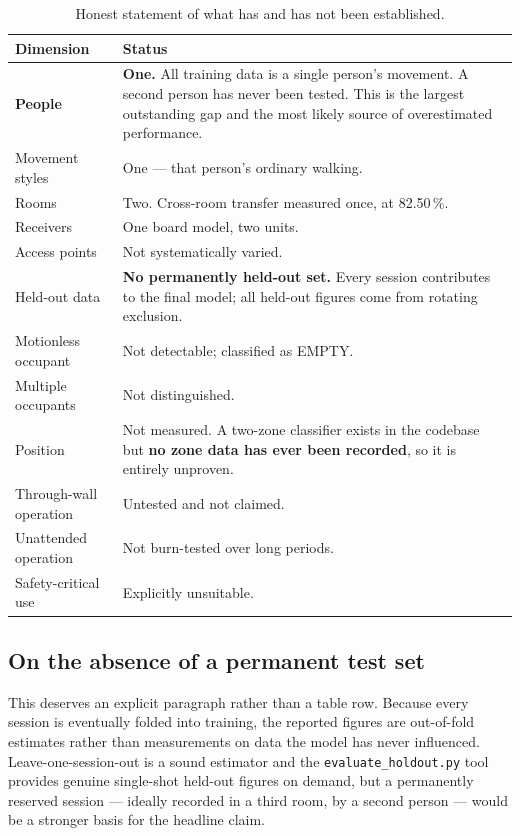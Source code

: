\documentclass[11pt,a4paper]{article}
\newcommand{\code}[1]{\texttt{\small #1}}
\begin{document}
\begin{table}[H]
\centering
\caption{Honest statement of what has and has not been established.}
\label{tab:limits}
\begin{tabularx}{\linewidth}{@{}lX@{}}
\toprule
\textbf{Dimension} & \textbf{Status} \\
\midrule
\textbf{People} & \textbf{One.} All training data is a single person's
movement. A second person has never been tested. This is the largest
outstanding gap and the most likely source of overestimated performance. \\
Movement styles & One --- that person's ordinary walking. \\
Rooms & Two. Cross-room transfer measured once, at 82.50\,\%. \\
Receivers & One board model, two units. \\
Access points & Not systematically varied. \\
Held-out data & \textbf{No permanently held-out set.} Every session
contributes to the final model; all held-out figures come from rotating
exclusion. \\
Motionless occupant & Not detectable; classified as EMPTY. \\
Multiple occupants & Not distinguished. \\
Position & Not measured. A two-zone classifier exists in the codebase but
\textbf{no zone data has ever been recorded}, so it is entirely unproven. \\
Through-wall operation & Untested and not claimed. \\
Unattended operation & Not burn-tested over long periods. \\
Safety-critical use & Explicitly unsuitable. \\
\bottomrule
\end{tabularx}
\end{table}

\subsection{On the absence of a permanent test set}

This deserves an explicit paragraph rather than a table row. Because every
session is eventually folded into training, the reported figures are
out-of-fold estimates rather than measurements on data the model has never
influenced. Leave-one-session-out is a sound estimator and the
\code{evaluate\_holdout.py} tool provides genuine single-shot held-out figures
on demand, but a permanently reserved session --- ideally recorded in a third
room, by a second person --- would be a stronger basis for the headline claim.
\end{document}
